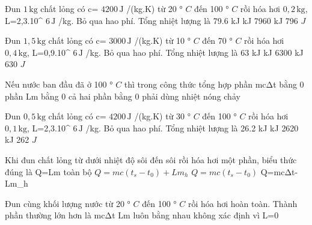 \begin{ex}
Đun $1\,\text{kg}$ chất lỏng có c= $4200\,\text{J}$ /(kg.K) từ 20 ° $C$ đến 100 ° $C$ rồi hóa hơi $0,2\,\text{kg}$, L=2,3.10^ $6\,\text{J}$ /kg. Bỏ qua hao phí. Tổng nhiệt lượng là
\choice
{79.6 kJ}
{ kJ}
{7960 kJ}
{796 $J$}
\end{ex}

\begin{ex}
Đun $1,5\,\text{kg}$ chất lỏng có c= $3000\,\text{J}$ /(kg.K) từ 10 ° $C$ đến 70 ° $C$ rồi hóa hơi $0,4\,\text{kg}$, L=0,9.10^ $6\,\text{J}$ /kg. Bỏ qua hao phí. Tổng nhiệt lượng là
\choice
{63 kJ}
{ kJ}
{6300 kJ}
{630 $J$}
\end{ex}

\begin{ex}
Nếu nước ban đầu đã ở 100 ° $C$ thì trong công thức tổng hợp
\choice
{\True phần mcΔt bằng 0}
{phần Lm bằng 0}
{cả hai phần bằng 0}
{phải dùng nhiệt nóng chảy}
\end{ex}

\begin{ex}
Đun $0,5\,\text{kg}$ chất lỏng có c= $4200\,\text{J}$ /(kg.K) từ 30 ° $C$ đến 100 ° $C$ rồi hóa hơi $0,1\,\text{kg}$, L=2,3.10^ $6\,\text{J}$ /kg. Bỏ qua hao phí. Tổng nhiệt lượng là
\choice
{26.2 kJ}
{ kJ}
{2620 kJ}
{262 $J$}
\end{ex}

\begin{ex}
Khi đun chất lỏng từ dưới nhiệt độ sôi đến sôi rồi hóa hơi một phần, biểu thức đúng là
\choice
{Q=Lm toàn bộ}
{\True $Q=mc(t_s-t_0)+Lm_h$}
{$Q=mc(t_s-t_0)$}
{Q=mcΔt-Lm_h}
\end{ex}

\begin{ex}
Đun cùng khối lượng nước từ 20 ° $C$ đến 100 ° $C$ rồi hóa hơi hoàn toàn. Thành phần thường lớn hơn là
\choice
{mcΔt}
{\True Lm}
{luôn bằng nhau}
{không xác định vì L=0}
\end{ex}


